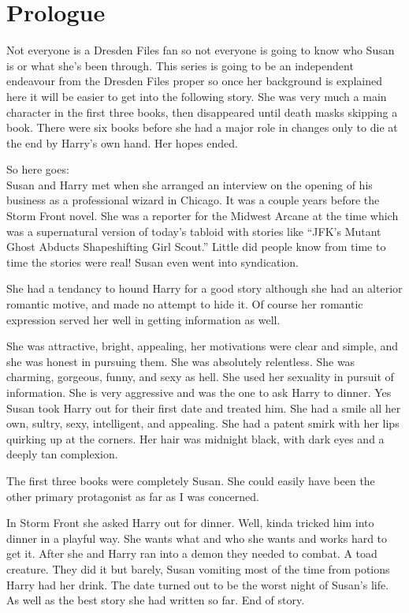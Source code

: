 \documentclass[12pt,twoside,onecolumn,openright,extrafontsizes]{memoir}
\begin{document}
\chapter*{Prologue}
{Not everyone is a Dresden Files fan so not everyone is going to know who Susan is or what she's been through. This series is going to be an independent endeavour from the Dresden Files proper so once her background is explained here it will be easier to get into the following story. She was very much a main character in the first three books, then disappeared until death masks skipping a book. There were six books before she had a major role in changes only to die at the end by Harry's own hand. Her hopes ended.

So here goes:\\
	\smallskip
Susan and Harry met when she arranged an interview on the opening of his business as a professional wizard in Chicago. It was a couple years before the Storm Front novel. She was a reporter for the Midwest Arcane at the time which was a supernatural version of today's tabloid with stories like ``JFK’s Mutant Ghost Abducts Shapeshifting Girl Scout.'' Little did people know from time to time the stories were real! Susan even went into syndication.

She had a tendancy to hound Harry for a good story although she had an alterior romantic motive, and made no attempt to hide it. Of course her romantic expression served her well in getting information as well.

She was attractive, bright, appealing, her motivations were clear and simple, and she was honest in pursuing them. She was absolutely relentless. She was charming, gorgeous, funny, and sexy as hell. She used her sexuality in pursuit of information. She is very aggressive and was the one to ask Harry to dinner. Yes Susan took Harry out for their first date and treated him. She had a smile all her own, sultry, sexy, intelligent, and appealing. She had a patent smirk with her lips quirking up at the corners. Her hair was midnight black, with dark eyes and a deeply tan complexion.

The first three books were completely Susan. She could easily have been the other primary protagonist as far as I was concerned.

In Storm Front she asked Harry out for dinner. Well, kinda tricked him into dinner in a playful way. She wants what and who she wants and works hard to get it. After she and Harry ran into a demon they needed to combat. A toad creature. They did it but barely, Susan vomiting most of the time from potions Harry had her drink. The date turned out to be the worst night of Susan's life. As well as the best story she had written so far. End of story.

}
\end{document}

